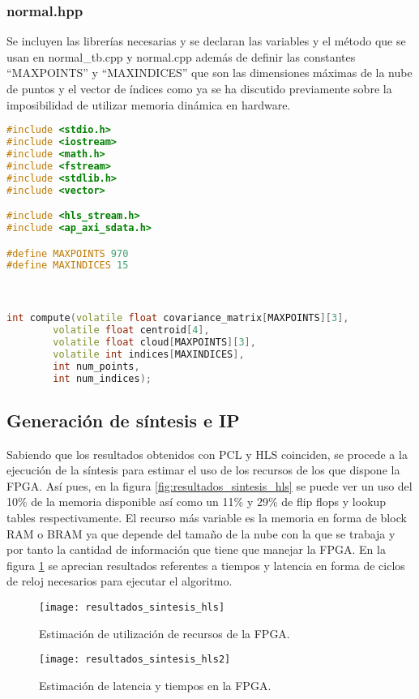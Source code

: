 \subsubsection{normal.hpp}

Se incluyen las librerías necesarias y se declaran las variables y el método que se usan en normal\_tb.cpp y normal.cpp además de definir las constantes ``MAXPOINTS'' y ``MAXINDICES'' que son las dimensiones máximas de la nube de puntos y el vector de índices como ya se ha discutido previamente sobre la imposibilidad de utilizar memoria dinámica en hardware.

\begin{lstlisting}[language=C++,breaklines]
#include <stdio.h>
#include <iostream>
#include <math.h>
#include <fstream>
#include <stdlib.h>
#include <vector>

#include <hls_stream.h>
#include <ap_axi_sdata.h>

#define MAXPOINTS 970
#define MAXINDICES 15



int compute(volatile float covariance_matrix[MAXPOINTS][3],
		volatile float centroid[4],
		volatile float cloud[MAXPOINTS][3],
		volatile int indices[MAXINDICES],
		int num_points,
		int num_indices);
\end{lstlisting}


\subsection{Generación de síntesis e IP}

Sabiendo que los resultados obtenidos con PCL y HLS coinciden, se procede a la ejecución de la síntesis para estimar el uso de los recursos de los que dispone la FPGA. Así pues, en la figura \ref{fig:resultados_sintesis_hls} se puede ver un uso del 10\% de la memoria disponible así como un 11\% y 29\% de flip flops y lookup tables respectivamente. El recurso más variable es la memoria en forma de block RAM o BRAM ya que depende del tamaño de la nube con la que se trabaja y por tanto la cantidad de información que tiene que manejar la FPGA. En la figura \ref{fig:resultados_sintesis_hls2} se aprecian resultados referentes a tiempos y latencia en forma de ciclos de reloj necesarios para ejecutar el algoritmo.

\begin{figure}[!htb]
  \texttt{[image: resultados\_sintesis\_hls]}
  \caption{Estimación de utilización de recursos de la FPGA.}\label{fig:resultados_sintesis_hls}
\endminipage\hfill
{}
  \texttt{[image: resultados\_sintesis\_hls2]}
  \caption{Estimación de latencia y tiempos en la FPGA.}\label{fig:resultados_sintesis_hls2}
\endminipage\hfill
\end{figure}

